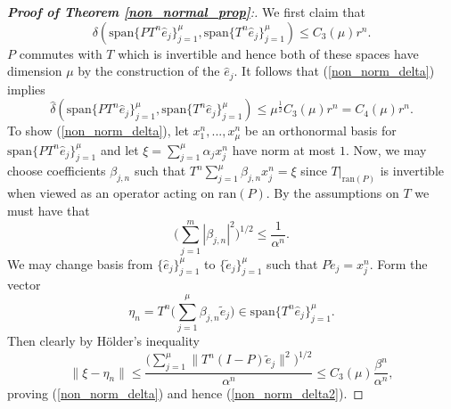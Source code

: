\documentclass[a4paper,10pt]{article}
\begin{document}
\begin{proof}[\textbf{Proof of Theorem \ref{non_normal_prop}}:]
We first claim that
\begin{equation}
\label{non_norm_delta}
\delta(\mathrm{span}\{PT^n\hat e_j\}_{j=1}^\mu,\mathrm{span}\{T^n\hat e_j\}_{j=1}^\mu)\leq C_3(\mu)r^n.
\end{equation}
$P$ commutes with $T$ which is invertible and hence both of these spaces have dimension $\mu$ by the construction of the $\hat e_j$. It follows that (\ref{non_norm_delta}) implies
\begin{equation}
\label{non_norm_delta2}
\hat\delta(\mathrm{span}\{PT^n\hat e_j\}_{j=1}^\mu,\mathrm{span}\{T^n\hat e_j\}_{j=1}^\mu)\leq \mu^{\frac{1}{2}}C_3(\mu)r^n=C_4(\mu)r^n.
\end{equation}
To show (\ref{non_norm_delta}), let $x_1^n,...,x_\mu^n$ be an orthonormal basis for $\mathrm{span}\{PT^n\hat e_j\}_{j=1}^\mu$ and let $\xi=\sum_{j=1}^\mu \alpha_j x_j^n$ have norm at most $1$. Now, we may choose coefficients $\beta_{j,n}$ such that $
T^n\sum_{j=1}^\mu \beta_{j,n} x_j^n = \xi$ since $T|_{\mathrm{ran}(P)}$ is invertible when viewed as an operator acting on $\mathrm{ran}(P)$. By the assumptions on $T$ we must have that
$$
\big(\sum_{j=1}^m\left|\beta_{j,n}\right|^2\big)^{1/2} \leq \frac{1}{\alpha^n}.
$$
We may change basis from $\{\hat e_j\}_{j=1}^\mu$ to $\{\tilde e_j\}_{j=1}^\mu$ such that $P\tilde e_j=x_j^n$. Form the vector
$$
\eta_n= T^n\big(\sum_{j=1}^\mu\beta_{j,n} \tilde e_j\big)\in \mathrm{span}\{T^n\hat e_j\}_{j=1}^\mu.
$$
Then clearly by H\"older's inequality
$$
\|\xi-\eta_n\|\leq \frac{\big(\sum_{j=1}^\mu\|T^n(I-P)\tilde e_j\|^2\big)^{1/2}}{\alpha^n}\leq C_3(\mu)\frac{\beta^n}{\alpha^n},
$$
proving (\ref{non_norm_delta}) and hence (\ref{non_norm_delta2}).


\end{proof}
\end{document}
